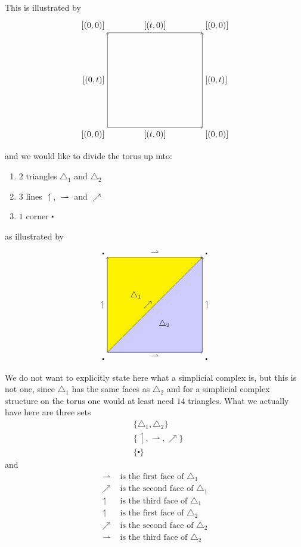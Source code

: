 This is illustrated by
\[
\begin{tikzpicture}[scale=4]
  \draw[->]
    (0,0) node[below left] {$[(0,0)]$}
    -- node[below] {$[(t,0)]$}
    (1,0) node[below right] {$[(0,0)]$};
  \draw[->]
    (0,1) node[above left] {$[(0,0)]$}
    -- node[above] {$[(t,0)]$}
    (1,1) node[above right] {$[(0,0)]$};
  \draw[->]
    (0,0)
    -- node[left] {$[(0,t)]$}
    (0,1) ;
  \draw[->]
    (1,0)
    -- node[right] {$[(0,t)]$}
    (1,1);
\end{tikzpicture}
\]
and we would like to divide the torus up into:
\begin{enumerate}
\item[$\bullet$]
$2$ triangles $\triangle_{1}$ and $\triangle_{2}$
\item[$\bullet$]
$3$ lines $\upharpoonleft$, $\rightharpoonup$ and $\nearrow$
\item[$\bullet$]
$1$ corner $\centerdot$
\end{enumerate}
as illustrated by
\[
\begin{tikzpicture}[scale=4]
  \fill[yellow]
    (0,0)
    --
    (0,1)
    --
    (1,1)
    --
    cycle;
  \fill[blue!20]
    (0,0)
    --
    (1,0)
    --
    (1,1)
    --
    cycle;
  \draw
    (0.3,0.6) node {$\triangle_{1}$};
  \draw
    (0.6,0.3) node {$\triangle_{2}$};
  \draw[->]
    (0,0) node[below left] {$\centerdot$}
    -- node[below] {$\rightharpoonup$}
    (1,0) node[below right] {$\centerdot$};
  \draw[->]
    (0,1) node[above left] {$\centerdot$}
    -- node[above] {$\rightharpoonup$}
    (1,1) node[above right] {$\centerdot$};
  \draw[->]
    (0,0)
    -- node[left] {$\nearrow$}
    (1,1);
  \draw[->]
    (0,0)
    -- node[left] {$\upharpoonleft$}
    (0,1);
  \draw[->]
    (1,0)
    -- node[right] {$\upharpoonleft$}
    (1,1);
\end{tikzpicture}
\]
We do not want to explicitly state here what a simplicial complex is, but this is not one, since $\triangle_{1}$ has the same faces as $\triangle_{2}$ and for a simplicial complex structure on the torus one would at least need $14$ triangles.
What we actually have here are three sets
\begin{align*}
  &
  \lbrace
    \triangle_{1},
    \triangle_{2}
  \rbrace
  \\
  &
  \lbrace
    \upharpoonleft,
    \rightharpoonup,
    \nearrow
  \rbrace
  \\
  &
  \lbrace
    \centerdot
  \rbrace
\end{align*}
and
\begin{align*}
  \rightharpoonup
  &\text{ is the first face of }
  \triangle_{1}
  \\
  \nearrow
  &\text{ is the second face of }
  \triangle_{1}
  \\
  \upharpoonleft
  &\text{ is the third face of }
  \triangle_{1}
  \\
  \upharpoonleft
  &\text{ is the first face of }
  \triangle_{2}
  \\
  \nearrow
  &\text{ is the second face of }
  \triangle_{2}
  \\
  \rightharpoonup
  &\text{ is the third face of }
  \triangle_{2}
\end{align*}
